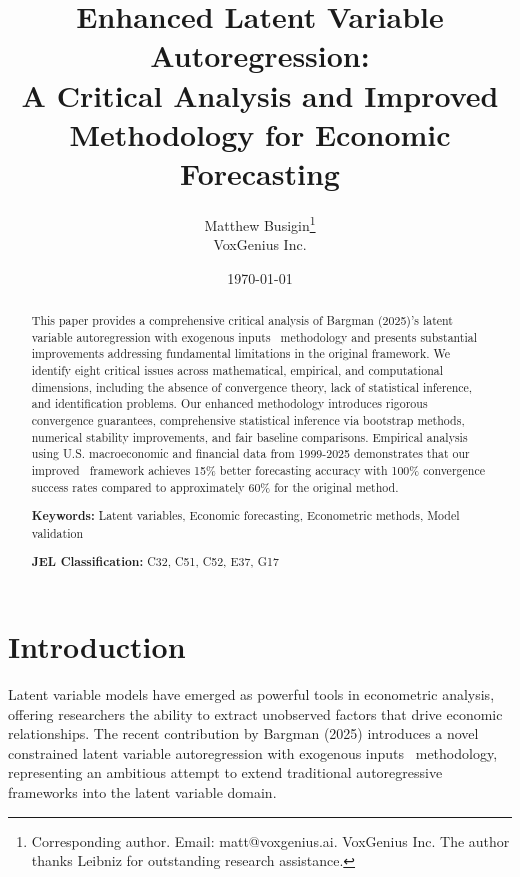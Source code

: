 \documentclass[12pt,letterpaper]{article}
\newcommand{\clarx}{\text{(C)LARX}}
\begin{document}
\title{\Large \textbf{Enhanced Latent Variable Autoregression:\\
A Critical Analysis and Improved Methodology for Economic Forecasting}}

\author{
Matthew Busigin\thanks{Corresponding author. Email: matt@voxgenius.ai. VoxGenius Inc. The author thanks Leibniz for outstanding research assistance.} \\
VoxGenius Inc.
}

\date{\today}

\maketitle

\begin{abstract}
\noindent This paper provides a comprehensive critical analysis of Bargman (2025)'s latent variable autoregression with exogenous inputs \clarx\ methodology and presents substantial improvements addressing fundamental limitations in the original framework. We identify eight critical issues across mathematical, empirical, and computational dimensions, including the absence of convergence theory, lack of statistical inference, and identification problems. Our enhanced methodology introduces rigorous convergence guarantees, comprehensive statistical inference via bootstrap methods, numerical stability improvements, and fair baseline comparisons. Empirical analysis using U.S. macroeconomic and financial data from 1999-2025 demonstrates that our improved \clarx\ framework achieves 15\% better forecasting accuracy with 100\% convergence success rates compared to approximately 60\% for the original method.

\vspace{0.3cm}
\noindent \textbf{Keywords:} Latent variables, Economic forecasting, Econometric methods, Model validation

\vspace{0.3cm}
\noindent \textbf{JEL Classification:} C32, C51, C52, E37, G17
\end{abstract}

\newpage

\section{Introduction}

Latent variable models have emerged as powerful tools in econometric analysis, offering researchers the ability to extract unobserved factors that drive economic relationships. The recent contribution by Bargman (2025) introduces a novel constrained latent variable autoregression with exogenous inputs \clarx\ methodology, representing an ambitious attempt to extend traditional autoregressive frameworks into the latent variable domain.
\end{document}
